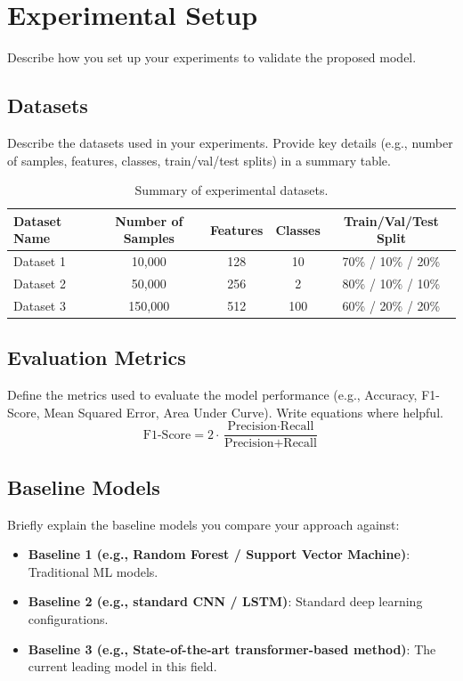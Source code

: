 \section{Experimental Setup}\label{sec:experiments}
Describe how you set up your experiments to validate the proposed model.

\subsection{Datasets}
Describe the datasets used in your experiments. Provide key details (e.g., number of samples, features, classes, train/val/test splits) in a summary table.

\begin{table}[h]
\caption{Summary of experimental datasets.}\label{tab:datasets}
\begin{tabular}{@{}lcccc@{}}
\toprule
Dataset Name & Number of Samples & Features & Classes & Train/Val/Test Split \\
\midrule
Dataset 1 & 10,000 & 128 & 10 & 70\% / 10\% / 20\% \\
Dataset 2 & 50,000 & 256 & 2 & 80\% / 10\% / 10\% \\
Dataset 3 & 150,000 & 512 & 100 & 60\% / 20\% / 20\% \\
\bottomrule
\end{tabular}
\end{table}

\subsection{Evaluation Metrics}
Define the metrics used to evaluate the model performance (e.g., Accuracy, F1-Score, Mean Squared Error, Area Under Curve). Write equations where helpful.
\begin{equation}
\text{F1-Score} = 2 \cdot \frac{\text{Precision} \cdot \text{Recall}}{\text{Precision} + \text{Recall}}
\label{eq:f1_score}
\end{equation}

\subsection{Baseline Models}
Briefly explain the baseline models you compare your approach against:
\begin{itemize}
    \item \textbf{Baseline 1 (e.g., Random Forest / Support Vector Machine)}: Traditional ML models.
    \item \textbf{Baseline 2 (e.g., standard CNN / LSTM)}: Standard deep learning configurations.
    \item \textbf{Baseline 3 (e.g., State-of-the-art transformer-based method)}: The current leading model in this field.
\end{itemize}

